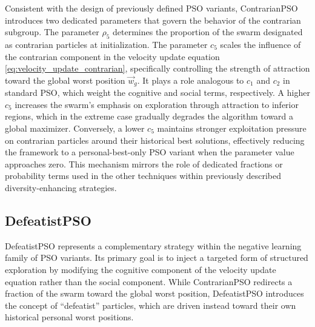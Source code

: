 {Consistent with the design of previously defined PSO variants, ContrarianPSO introduces two dedicated parameters that govern the behavior of the contrarian subgroup.  The parameter $\rho_5$ determines the proportion of the swarm designated as contrarian particles at initialization. The parameter  $c_5$ scales the influence of the contrarian component in the velocity update equation \eqref{eq:velocity_update_contrarian}, specifically controlling the strength of attraction toward the global worst position $\vec{w}_g$. It plays a role analogous to $c_1$ and $c_2$ in standard PSO, which weight the cognitive and social terms, respectively. A higher $c_5$  increases the swarm’s emphasis on exploration through attraction to inferior regions, which in the extreme case gradually degrades the algorithm toward a global maximizer. Conversely, a lower $c_5$ maintains stronger exploitation pressure on contrarian particles around their historical best solutions, effectively reducing the framework to a personal-best-only PSO variant when 
the parameter value approaches zero. This mechanism mirrors the role of dedicated fractions or probability terms used in the other techniques within previously described diversity-enhancing strategies.

















\subsection{DefeatistPSO}

DefeatistPSO represents a complementary strategy within the negative learning family of PSO variants. Its primary goal is to inject a targeted form of structured exploration by modifying the cognitive component of the velocity update equation rather than the social component. While ContrarianPSO redirects a fraction of the swarm toward the global worst position, DefeatistPSO introduces the concept of ``defeatist'' particles, which are driven instead toward their own historical personal worst positions.


}
